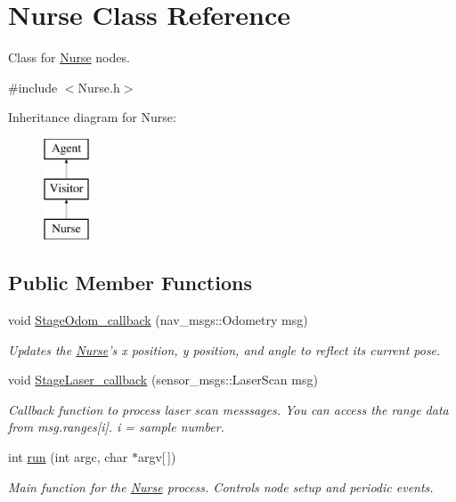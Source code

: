 \hypertarget{classNurse}{\section{Nurse Class Reference}
\label{classNurse}
}


Class for \hyperlink{classNurse}{Nurse} nodes.  




{\ttfamily \#include $<$Nurse.\-h$>$}

Inheritance diagram for Nurse\-:\begin{figure}[H]
\begin{center}
\leavevmode
\includegraphics[height=3.000000cm]{classNurse}
\end{center}
\end{figure}
\subsection*{Public Member Functions}
\begin{DoxyCompactItemize}
\item 
void \hyperlink{classNurse_a3ff47edb35f171a538fe62b3abdca948}{Stage\-Odom\-\_\-callback} (nav\-\_\-msgs\-::\-Odometry msg)
\begin{DoxyCompactList}\small\item\em Updates the \hyperlink{classNurse}{Nurse}'s x position, y position, and angle to reflect its current pose. \end{DoxyCompactList}\item 
void \hyperlink{classNurse_aa709fbc5dc09b8db82db59c1a2829d4a}{Stage\-Laser\-\_\-callback} (sensor\-\_\-msgs\-::\-Laser\-Scan msg)
\begin{DoxyCompactList}\small\item\em Callback function to process laser scan messsages. You can access the range data from msg.\-ranges\mbox{[}i\mbox{]}. i = sample number. \end{DoxyCompactList}\item 
\hypertarget{classNurse_ab58da68573cbe6f62dab9298acfd6ba6}{int \hyperlink{classNurse_ab58da68573cbe6f62dab9298acfd6ba6}{run} (int argc, char $\ast$argv\mbox{[}$\,$\mbox{]})}\label{classNurse_ab58da68573cbe6f62dab9298acfd6ba6}

\begin{DoxyCompactList}\small\item\em Main function for the \hyperlink{classNurse}{Nurse} process. Controls node setup and periodic events. \end{DoxyCompactList}\end{DoxyCompactItemize}
